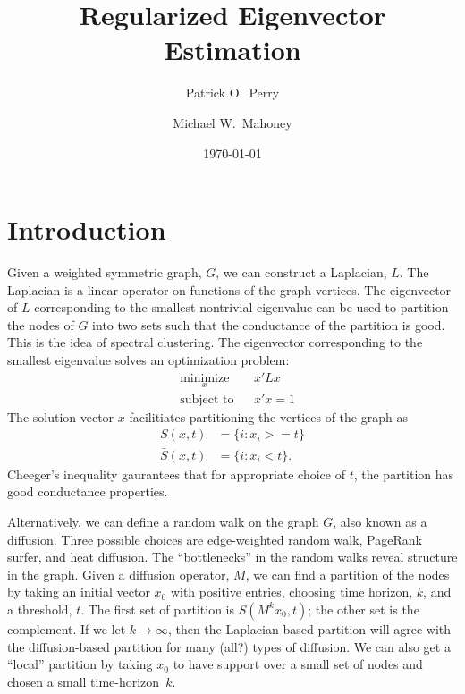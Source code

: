 \documentclass{article}
\begin{document}
\title{
  Regularized Eigenvector Estimation
}
\author{
  Patrick O.\ Perry
  \and
  Michael W.\ Mahoney
}
\date{
  \today
}
\maketitle

\begin{abstract}
\end{abstract}

\section{Introduction}
\label{S:introduction}

Given a weighted symmetric graph, $G$, we can construct a Laplacian, $L$.  The Laplacian is a linear operator on functions of the graph vertices.  The eigenvector of $L$ corresponding to the smallest nontrivial eigenvalue can be used to partition the nodes of $G$ into two sets such that the conductance of the partition is good.  This is the idea of spectral clustering.   The eigenvector corresponding
to the smallest eigenvalue solves an optimization problem:
\[
\begin{aligned}
  & \underset{x}{\text{minimize}}
  & & x' L x \\
  & \text{subject to}
  & & x' x = 1
\end{aligned}
\]
The solution vector $x$ facilitiates partitioning the vertices of the graph as
\begin{align*}
  S(x,t)      &= \{ i : x_i >= t \} \\
  \bar S(x,t) &= \{ i : x_i < t \}.
\end{align*}
Cheeger's inequality gaurantees that for appropriate choice of $t$, the partition has good conductance properties.

Alternatively, we can define a random walk on the graph $G$, also known as a diffusion.  Three possible choices are edge-weighted random walk, PageRank surfer, and heat diffusion.  The ``bottlenecks'' in the random walks reveal structure in the graph.  Given a diffusion operator, $M$, we can find a partition of the nodes by taking an initial vector $x_0$ with positive entries, choosing time horizon, $k$, and a threshold, $t$.  The first set of partition is $S(M^k x_0, t)$; the other set is the complement.  If we let $k\to \infty$, then the Laplacian-based partition will agree with the diffusion-based partition for many (all?) types of diffusion.  We can also get a ``local'' partition by taking $x_0$ to have support over a small set of nodes and chosen a small time-horizon~$k$.
\end{document}

